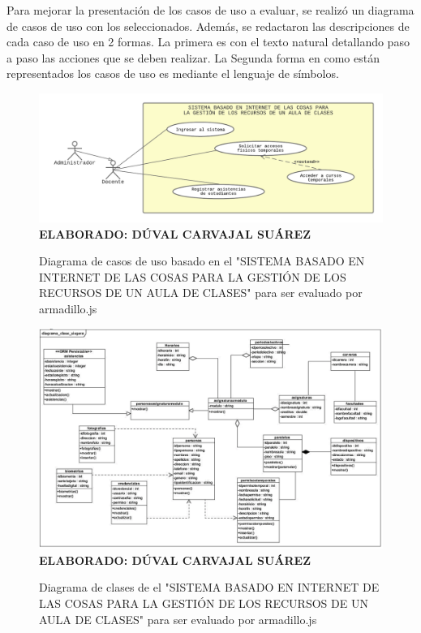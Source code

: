 Para mejorar la presentación de los casos de uso a evaluar, se realizó un diagrama de casos de uso con los seleccionados. Además, se redactaron las descripciones de cada caso de uso en 2 formas. La primera es con el texto natural detallando paso a paso las acciones que se deben realizar. La Segunda forma en como están representados los casos de uso es mediante el lenguaje de símbolos.

\begin{figure}[h!]
	\caption{Diagrama de casos de uso basado en el "SISTEMA BASADO EN INTERNET DE LAS COSAS PARA LA GESTIÓN DE LOS RECURSOS DE UN AULA DE CLASES" para ser evaluado por armadillo.js}
	\includegraphics[width=15cm]{img/dcu_eva_ai.png}
	\label{fig:dcu_eva_aula_inteligente}
	\textbf{\\ ELABORADO: DÚVAL CARVAJAL SUÁREZ}
\end{figure}

\begin{figure}[h!]
	\caption{Diagrama de clases de el "SISTEMA BASADO EN INTERNET DE LAS COSAS PARA LA GESTIÓN DE LOS RECURSOS DE UN AULA DE CLASES" para ser evaluado por armadillo.js}
	\includegraphics[width=13cm]{img/dclases-ai.png}
	\label{fig:dc_aula_inteligente}
	\textbf{\\ ELABORADO: DÚVAL CARVAJAL SUÁREZ}
\end{figure}

